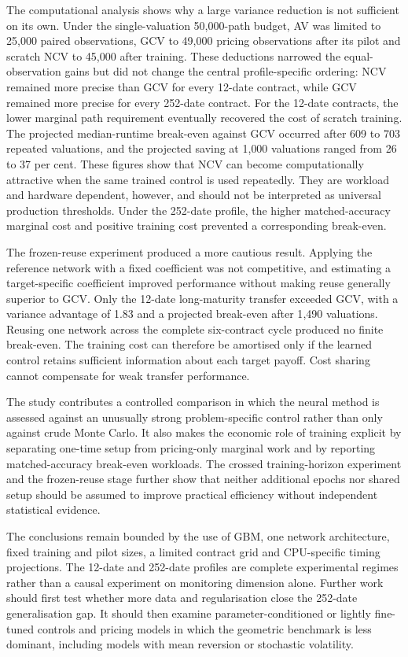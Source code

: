 The computational analysis shows why a large variance reduction is not sufficient on its own. Under the single-valuation 50{,}000-path budget, AV was limited to 25{,}000 paired observations, GCV to 49{,}000 pricing observations after its pilot and scratch NCV to 45{,}000 after training. These deductions narrowed the equal-observation gains but did not change the central profile-specific ordering: NCV remained more precise than GCV for every 12-date contract, while GCV remained more precise for every 252-date contract. For the 12-date contracts, the lower marginal path requirement eventually recovered the cost of scratch training. The projected median-runtime break-even against GCV occurred after 609 to 703 repeated valuations, and the projected saving at 1{,}000 valuations ranged from 26 to 37 per cent. These figures show that NCV can become computationally attractive when the same trained control is used repeatedly. They are workload and hardware dependent, however, and should not be interpreted as universal production thresholds. Under the 252-date profile, the higher matched-accuracy marginal cost and positive training cost prevented a corresponding break-even.

The frozen-reuse experiment produced a more cautious result. Applying the reference network with a fixed coefficient was not competitive, and estimating a target-specific coefficient improved performance without making reuse generally superior to GCV. Only the 12-date long-maturity transfer exceeded GCV, with a variance advantage of 1.83 and a projected break-even after 1{,}490 valuations. Reusing one network across the complete six-contract cycle produced no finite break-even. The training cost can therefore be amortised only if the learned control retains sufficient information about each target payoff. Cost sharing cannot compensate for weak transfer performance.

The study contributes a controlled comparison in which the neural method is assessed against an unusually strong problem-specific control rather than only against crude Monte Carlo. It also makes the economic role of training explicit by separating one-time setup from pricing-only marginal work and by reporting matched-accuracy break-even workloads. The crossed training-horizon experiment and the frozen-reuse stage further show that neither additional epochs nor shared setup should be assumed to improve practical efficiency without independent statistical evidence.

The conclusions remain bounded by the use of GBM, one network architecture, fixed training and pilot sizes, a limited contract grid and CPU-specific timing projections. The 12-date and 252-date profiles are complete experimental regimes rather than a causal experiment on monitoring dimension alone. Further work should first test whether more data and regularisation close the 252-date generalisation gap. It should then examine parameter-conditioned or lightly fine-tuned controls and pricing models in which the geometric benchmark is less dominant, including models with mean reversion or stochastic volatility.

